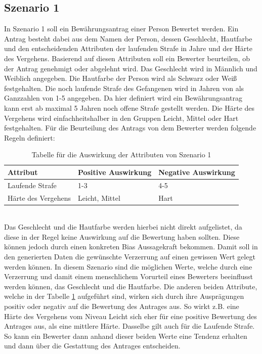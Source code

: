 \begin{onehalfspace}
\subsection{Szenario 1}
\label{subsubsec:szenario1}
In Szenario 1 soll ein Bewährungsantrag einer Person Bewertet werden. Ein Antrag besteht dabei aus dem Namen der Person, dessen Geschlecht, Hautfarbe und den entscheidenden Attributen der laufenden Strafe in Jahre und der Härte des Vergehens. Basierend auf diesen Attributen soll ein Bewerter beurteilen, ob der Antrag genehmigt oder abgelehnt wird. Das Geschlecht wird in \glqq{}Männlich\grqq{} und \glqq{}Weiblich\grqq{} angegeben. Die Hautfarbe der Person wird als \glqq{}Schwarz\grqq{} oder \glqq{}Weiß\grqq{} festgehalten. Die noch laufende Strafe des Gefangenen wird in Jahren von als Ganzzahlen von 1-5 angegeben. Da hier definiert wird ein Bewährungsantrag kann erst ab maximal 5 Jahren noch offene Strafe gestellt werden. Die Härte des Vergehens wird einfachheitshalber in den Gruppen \glqq{}Leicht\grqq{}, \glqq{}Mittel\grqq{} oder \glqq{}Hart\grqq{} festgehalten. \newline
Für die Beurteilung des Antrags von dem Bewerter werden folgende Regeln definiert:
\begin{table}[!h]
    \centering
    \begin{tabular}{|l|l|l|}
    \hline
    \textbf{Attribut}   & \textbf{Positive Auswirkung} & \textbf{Negative Auswirkung} \\ \hline
    Laufende Strafe     & 1-3                          & 4-5                          \\ \hline
    Härte des Vergehens & Leicht, Mittel               & Hart                         \\ \hline
    \end{tabular}
\caption{Tabelle für die Auswirkung der Attributen von Szenario 1}
\label{table:1}
\end{table}\\
Das Geschlecht und die Hautfarbe werden hierbei nicht direkt aufgelistet, da diese in der Regel keine Auswirkung auf die Bewertung haben sollten. Diese können jedoch durch einen konkreten Bias Aussagekraft bekommen. Damit soll in den generierten Daten die gewünschte Verzerrung auf einen gewissen Wert gelegt werden können. In diesem Szenario sind die möglichen Werte, welche durch eine Verzerrung und damit einem menschlichem Vorurteil eines Bewerters beeinflusst werden können, das Geschlecht und die Hautfarbe. Die anderen beiden Attribute, welche in der Tabelle \ref*{table:1} aufgeführt sind, wirken sich durch ihre Ausprägungen positiv oder negativ auf die Bewertung des Antrages aus. So wirkt z.B. eine Härte des Vergehens vom Niveau Leicht sich eher für eine positive Bewertung des Antrages aus, als eine mittlere Härte. Dasselbe gilt auch für die Laufende Strafe. So kann ein Bewerter dann anhand dieser beiden Werte eine Tendenz erhalten und dann über die Gestattung des Antrages entscheiden.

\end{onehalfspace}

